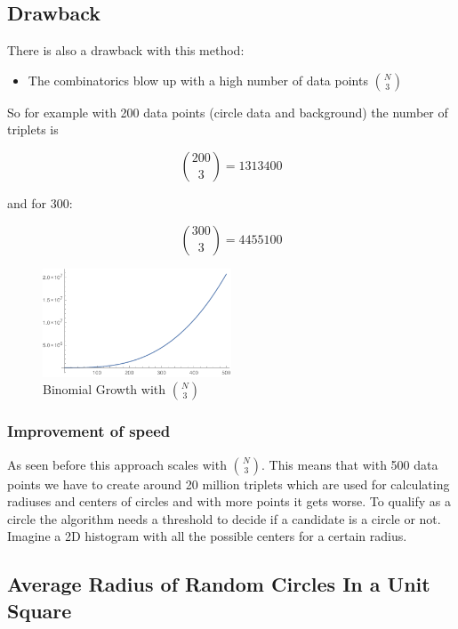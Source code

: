 \documentclass[10pt,twoside]{scrreprt}
\begin{document}
\subsection{Drawback}
	

There is also a drawback with this method:

\begin{itemize}
\item The combinatorics blow up with a high number of data points \( \binom{N}{3} \)
\end{itemize}

So for example with 200 data points (circle data and background) the number of triplets is

\[ \binom{200}{3} = 1313400 \]

and for 300:

\[ \binom{300}{3} = 4455100 \]


\begin{figure}[tb]
  \centering
  \includegraphics[width=0.5\textwidth]{pics/binomial_growth}
  \caption{Binomial Growth with $\binom{N}{3}$}
  \label{fig:figure1}
\end{figure}

\subsubsection{Improvement of speed} %
\label{ssub:improvement_of_speed}

As seen before this approach scales with $\binom{N}{3}$. This means that with 500 data points we have to create around 20 million triplets which are used for calculating radiuses and centers of circles and with more points it gets worse.
To qualify as a circle the algorithm needs a threshold to decide if a candidate is a circle or not. Imagine a 2D histogram with all the possible centers for a certain radius.


\subsection{Average Radius of Random Circles In a Unit Square} %
\label{ssub:average_radius_of_random_circles_in_a_unit_square}
\end{document}
